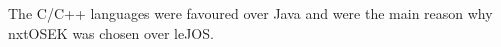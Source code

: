 The C/C++ languages were favoured over Java and were the main reason why nxtOSEK was chosen over leJOS.



























